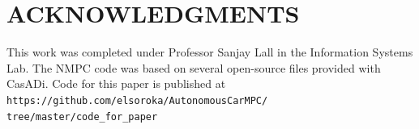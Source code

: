 \documentclass[letterpaper, 10 pt, conference]{ieeeconf}  %
\begin{document}








\section{ACKNOWLEDGMENTS}


This work was completed under Professor Sanjay Lall in the Information Systems Lab. The NMPC code was based on several open-source files provided with CasADi.
Code for this paper is published at \small\texttt{https://github.com/elsoroka/AutonomousCarMPC/
	tree/master/code\_for\_paper}\normalsize






\end{document}
